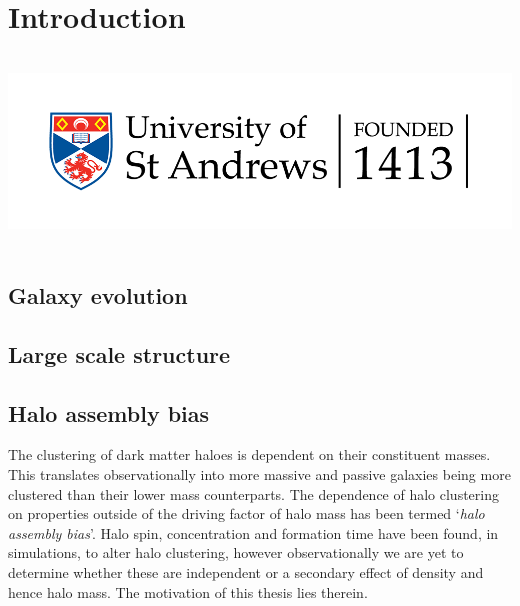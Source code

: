 \chapter{Introduction}
\vspace{-5in}
\includegraphics[height=2.0in]{thesis/latex/st_a_logo_.png}
\vspace{3in}

\label{ch:intro}
\section{Galaxy evolution}
\section{Large scale structure}
\section{Halo assembly bias}
The clustering of dark matter haloes is dependent on their constituent masses. This translates observationally into more massive and passive galaxies being more clustered than their lower mass counterparts. The dependence of halo clustering on properties outside of the driving factor of halo mass has been termed `\textit{halo assembly bias}'. Halo spin, concentration and formation time have been found, in simulations, to alter halo clustering, however observationally we are yet to determine whether these are independent or a secondary effect of density and hence halo mass. The motivation of this thesis lies therein. 